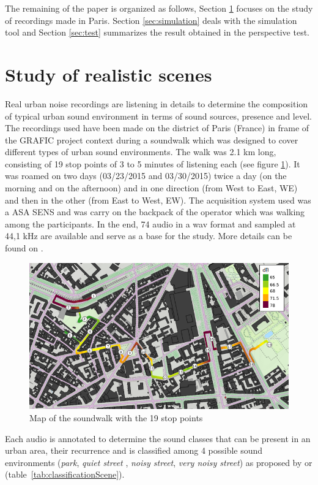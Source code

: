 \documentclass[a4,11pt,twocolumn]{article}
\begin{document}
The remaining of the paper is organized as follows, Section \ref{sec:study} focuses on the study of recordings made in Paris. Section \ref{sec:simulation} deals with the simulation tool and Section \ref{sec:test} summarizes the result obtained in the perspective test.


\section{Study of realistic scenes} \label{sec:study}
Real urban noise recordings are listening in details to determine the composition of typical urban sound environment in terms of sound sources, presence and level. The recordings used have been made on the  district of Paris (France) in frame of the GRAFIC project context \cite{aumond_sound_2016} during a soundwalk which was designed to cover different types of urban sound environments. The walk was 2.1 km long, consisting of 19 stop points of 3 to 5 minutes of listening each (see figure \ref{fig:soundwalk}). It was roamed on two days (03/23/2015 and 03/30/2015) twice a day (on the morning and on the afternoon) and in one direction (from West to East, WE) and then in the other (from East to West, EW). The acquisition system used was a ASA SENS and was carry on the backpack of the operator which was walking among the participants. In the end, 74 audio in a wav format and sampled at 44,1 kHz are available and serve as a base for the study. More details can be found on  \cite{aumond_modelling_2017}. \\

\begin{figure}[H]
\centering
\includegraphics[width=.5\textwidth]{./pictures/trajet_19pts.png}
\caption{Map of the soundwalk with the 19 stop points}
\label{fig:soundwalk}
\end{figure}


Each audio is annotated to determine the sound classes that can be present in an urban area, their recurrence and is classified among 4 possible sound environments (\textit{park}, \textit{quiet street} , \textit{noisy street}, \textit{very noisy street}) as proposed by \cite{rychtarikova_soundscape_2013} or \cite{can_describing_2015} (table~\ref{tab:classificationScene}).
\end{document}
